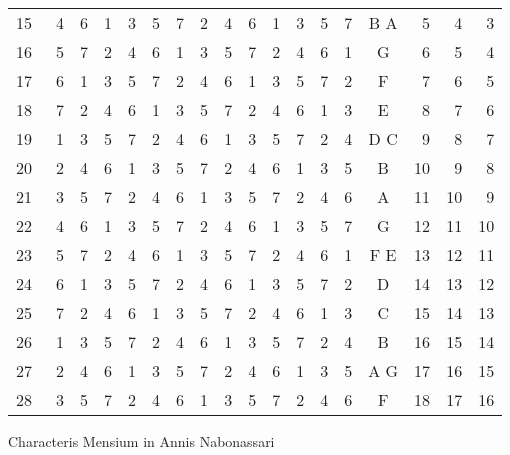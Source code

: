 \begin{tabnums}
\begin{tabular}[c]{@{} r  c c c c c c c c c c c c c  c c c c @{}}
%
15~ &
4 & 6 & 1 & 3 & 5 & 7 & 2 & 4 & 6 & 1 & 3 & 5 & 7 &
B A & ~5 & ~4 & ~3 \\
%
16~ &
5 & 7 & 2 & 4 & 6 & 1 & 3 & 5 & 7 & 2 & 4 & 6 & 1 &
 G  & ~6 & ~5 & ~4 \\
%
17~ &
6 & 1 & 3 & 5 & 7 & 2 & 4 & 6 & 1 & 3 & 5 & 7 & 2 &
 F  & ~7 & ~6 & ~5 \\
%
18~ &
7 & 2 & 4 & 6 & 1 & 3 & 5 & 7 & 2 & 4 & 6 & 1 & 3 &
 E  & ~8 & ~7 & ~6 \\
%
19~ &
1 & 3 & 5 & 7 & 2 & 4 & 6 & 1 & 3 & 5 & 7 & 2 & 4 &
D C & ~9 & ~8 & ~7 \\
%
20~ &
2 & 4 & 6 & 1 & 3 & 5 & 7 & 2 & 4 & 6 & 1 & 3 & 5 &
 B  & 10 & ~9 & ~8 \\
%
21~ &
3 & 5 & 7 & 2 & 4 & 6 & 1 & 3 & 5 & 7 & 2 & 4 & 6 &
 A  & 11 & 10 & ~9 \\
%
22~ &
4 & 6 & 1 & 3 & 5 & 7 & 2 & 4 & 6 & 1 & 3 & 5 & 7 &
 G  & 12 & 11 & 10 \\
%
23~ &
5 & 7 & 2 & 4 & 6 & 1 & 3 & 5 & 7 & 2 & 4 & 6 & 1 &
F E & 13 & 12 & 11 \\
%
24~ &
6 & 1 & 3 & 5 & 7 & 2 & 4 & 6 & 1 & 3 & 5 & 7 & 2 &
 D  & 14 & 13 & 12 \\
%
25~ &
7 & 2 & 4 & 6 & 1 & 3 & 5 & 7 & 2 & 4 & 6 & 1 & 3 &
 C  & 15 & 14 & 13 \\
%
26~ &
1 & 3 & 5 & 7 & 2 & 4 & 6 & 1 & 3 & 5 & 7 & 2 & 4 &
 B  & 16 & 15 & 14 \\
%
27~ &
2 & 4 & 6 & 1 & 3 & 5 & 7 & 2 & 4 & 6 & 1 & 3 & 5 &
A G & 17 & 16 & 15 \\
%
28~ &
3 & 5 & 7 & 2 & 4 & 6 & 1 & 3 & 5 & 7 & 2 & 4 & 6 &
 F  & 18 & 17 & 16 \\
%
\end{tabular}
%
\caption{Characteris Mensium in Annis Nabonassari}
\label{tab:p200}
%
\end{tabnums}
